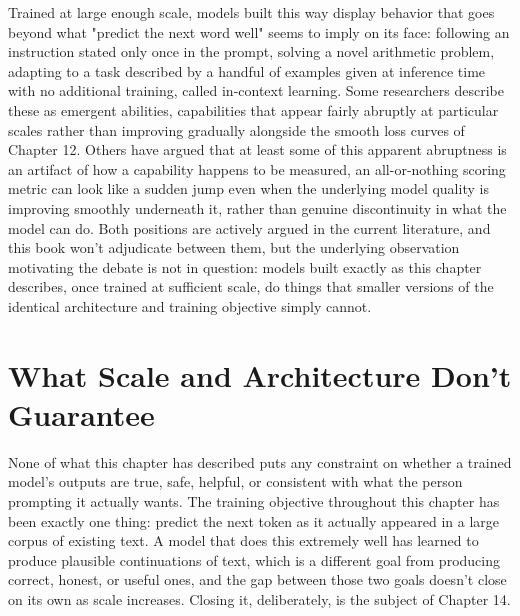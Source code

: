 Trained at large enough scale, models built this way display behavior that goes beyond what "predict the next word well" seems to imply on its face: following an instruction stated only once in the prompt, solving a novel arithmetic problem, adapting to a task described by a handful of examples given at inference time with no additional training, called in-context learning. Some researchers describe these as emergent abilities, capabilities that appear fairly abruptly at particular scales rather than improving gradually alongside the smooth loss curves of Chapter 12. Others have argued that at least some of this apparent abruptness is an artifact of how a capability happens to be measured, an all-or-nothing scoring metric can look like a sudden jump even when the underlying model quality is improving smoothly underneath it, rather than genuine discontinuity in what the model can do. Both positions are actively argued in the current literature, and this book won't adjudicate between them, but the underlying observation motivating the debate is not in question: models built exactly as this chapter describes, once trained at sufficient scale, do things that smaller versions of the identical architecture and training objective simply cannot.

\section*{What Scale and Architecture Don't Guarantee}

None of what this chapter has described puts any constraint on whether a trained model's outputs are true, safe, helpful, or consistent with what the person prompting it actually wants. The training objective throughout this chapter has been exactly one thing: predict the next token as it actually appeared in a large corpus of existing text. A model that does this extremely well has learned to produce plausible continuations of text, which is a different goal from producing correct, honest, or useful ones, and the gap between those two goals doesn't close on its own as scale increases. Closing it, deliberately, is the subject of Chapter 14.
